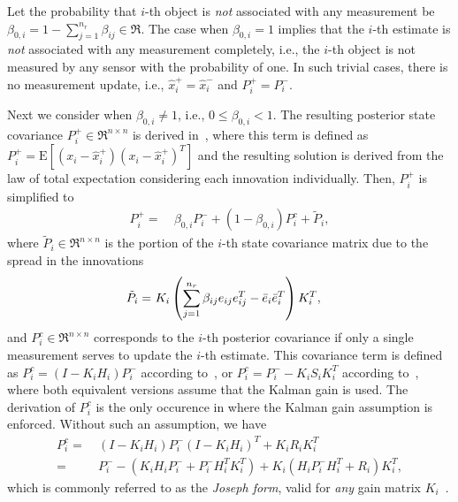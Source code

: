 Let the probability that $i$-th object is \textit{not} associated with any measurement be $\beta_{0,i}=1-{\sum_{j=1}^{n_r} \beta_{ij}}\in\Re$. The case when $\beta_{0,i}=1$ implies that the $i$-th estimate is \emph{not} associated with any measurement completely, i.e., the $i$-th object is not measured by any sensor with the probability of one. In such trivial cases, there is no measurement update, i.e., $\hat x^+_i=\hat x^-_i$ and $P_i^+=P_i^-$. 

Next we consider when $\beta_{0,i}\neq1$, i.e., $0\leq\beta_{0,i}<1$.
The resulting posterior state covariance $P^+_{i}\in\Re^{n\times n}$ is derived in~\cite[Eq. D-32 and D-33]{TrackDataAssoc}, where this term is defined as $P^+_{i}=\text{E}[(x_i-\hat x_i^+)(x_i-\hat x_i^+)^T]$ and the resulting solution is derived from the law of total expectation considering each innovation individually. Then, $P^+_{i}$ is simplified to
\begin{align}
\label{eqn:JPDAFCov}
P^+_{i}=&\ \beta_{0,i}P^-_{i}+(1-\beta_{0,i})P_i^c+\tilde P_i,
\end{align}
where $\tilde P_i\in\Re^{n\times n}$ is the portion of the $i$-th state covariance matrix due to the spread in the innovations
\begin{align}
\tilde P_i=&\ K_i\left( {\sum_{j=1}^{n_r} \beta_{ij}e_{ij}e_{ij}^T-{\bar{e}}_{i}}{\bar{e}}_{i}^T \right)K_{i}^T,\label{eqn:tildeP}
\end{align}
and $P_i^c\in\Re^{n\times n}$ corresponds to the $i$-th posterior covariance if only a single measurement serves to update the $i$-th estimate.
This covariance term is defined as $P^c_i=(I-K_iH_i)P_i^-$ according to~\cite[Eq. D-27]{TrackDataAssoc}, or $P^c_i=P_i^--K_iS_iK_i^T$ according to~\cite[Eq. 43]{JPDAF1}, where both equivalent versions assume that the Kalman gain is used. The derivation of $P^c_i$ is the only occurence in  where the Kalman gain assumption is enforced. Without such an assumption, we have%
\begin{align}
P^c_i=&\ (I-K_iH_i)P^-_i(I-K_iH_i)^T+K_iR_iK_i^T\nonumber
\\
=&\ P^-_i-(K_iH_iP^-_i+P^-_iH_i^TK_i^T)+K_i(H_iP^-_iH_i^T+R_i)K_i^T,
\label{eqn:GenCov}
\end{align}
which is commonly referred to as the \emph{Joseph form}, valid for \emph{any} gain matrix $K_i$~\cite{OptEst1}.
